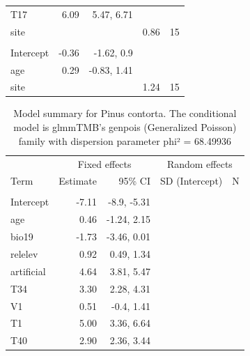 \documentclass[
]{article}
\begin{document}
\begin{longtable}[t]{lrrrr}
\hspace{1em}T17 & 6.09 & 5.47, 6.71 &  & \\
\hspace{1em}site &  &  & 0.86 & 15\\
\addlinespace[0.3em]
\multicolumn{5}{l}{\textbf{Zero-inflation model}}\\
\hspace{1em}Intercept & -0.36 & -1.62, 0.9 &  & \\
\hspace{1em}age & 0.29 & -0.83, 1.41 &  & \\
\hspace{1em}site &  &  & 1.24 & 15\\
\bottomrule
\end{longtable}

\begin{longtable}[t]{lrrrr}
\caption{\label{tab:summaries-tables}\label{tab:Pc}Model summary for Pinus contorta. The conditional model is glmmTMB's genpois (Generalized Poisson) family with dispersion parameter phi² = 68.49936}\\
\toprule
\multicolumn{1}{c}{ } & \multicolumn{2}{c}{Fixed effects} & \multicolumn{2}{c}{Random effects} \\
\cmidrule(l{3pt}r{3pt}){2-3} \cmidrule(l{3pt}r{3pt}){4-5}
Term & Estimate & 95\% CI & SD (Intercept) & N\\
\midrule
\addlinespace[0.3em]
\multicolumn{5}{l}{\textbf{Conditional model}}\\
\hspace{1em}Intercept & -7.11 & -8.9, -5.31 &  & \\
\hspace{1em}age & 0.46 & -1.24, 2.15 &  & \\
\hspace{1em}bio19 & -1.73 & -3.46, 0.01 &  & \\
\hspace{1em}relelev & 0.92 & 0.49, 1.34 &  & \\
\hspace{1em}artificial & 4.64 & 3.81, 5.47 &  & \\
\hspace{1em}T34 & 3.30 & 2.28, 4.31 &  & \\
\hspace{1em}V1 & 0.51 & -0.4, 1.41 &  & \\
\hspace{1em}T1 & 5.00 & 3.36, 6.64 &  & \\
\hspace{1em}T40 & 2.90 & 2.36, 3.44 &  & \\

\end{longtable}
\end{document}
